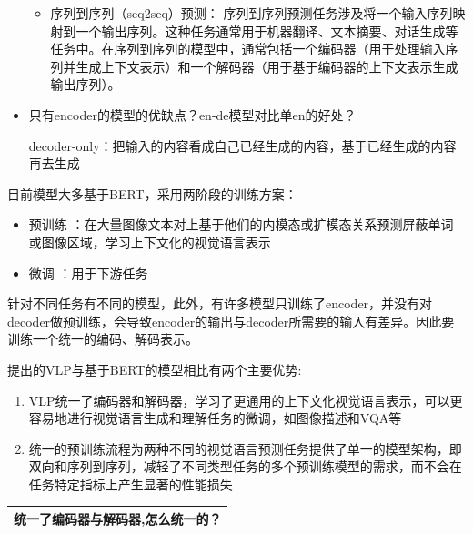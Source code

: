 \documentclass[a4paper]{article}
\begin{document}
\begin{sloppypar}
\begin{itemize}
\begin{itemize}
                        \item 序列到序列（seq2seq）预测：
                              序列到序列预测任务涉及将一个输入序列映射到一个输出序列。这种任务通常用于机器翻译、文本摘要、对话生成等任务中。在序列到序列的模型中，通常包括一个编码器（用于处理输入序列并生成上下文表示）和一个解码器（用于基于编码器的上下文表示生成输出序列）。
                  \end{itemize}
            \item 只有encoder的模型的优缺点？en-de模型对比单en的好处？

                  decoder-only：把输入的内容看成自己已经生成的内容，基于已经生成的内容再去生成


      \end{itemize}



      目前模型大多基于BERT，采用两阶段的训练方案：
      \begin{itemize}
            \item 预训练 ：在大量图像文本对上基于他们的内模态或扩模态关系预测屏蔽单词或图像区域，学习上下文化的视觉语言表示
            \item 微调   ：用于下游任务
      \end{itemize}


      针对不同任务有不同的模型，此外，有许多模型只训练了encoder，并没有对decoder做预训练，会导致encoder的输出与decoder所需要的输入有差异。因此要训练一个统一的编码、解码表示。


      提出的VLP与基于BERT的模型相比有两个主要优势:
      \begin{enumerate}
            \item VLP统一了编码器和解码器，学习了更通用的上下文化视觉语言表示，可以更容易地进行视觉语言生成和理解任务的微调，如图像描述和VQA等
            \item 统一的预训练流程为两种不同的视觉语言预测任务提供了单一的模型架构，即双向和序列到序列，减轻了不同类型任务的多个预训练模型的需求，而不会在任务特定指标上产生显著的性能损失
      \end{enumerate}


      \begin{table}[!htbp]
            \renewcommand\arraystretch{2}

            \centering
            \begin{tabularx}{\textwidth}{|X|}
                  \hline
                  统一了编码器与解码器,怎么统一的？ \\
                  \hline
            \end{tabularx}%


\end{table}
\end{sloppypar}
\end{document}
